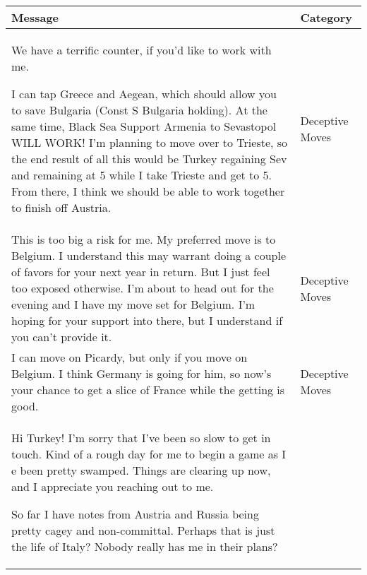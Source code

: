 \begin{table*}[t]
    \begin{tabular}{p{11cm}p{4cm}}
    \hline
    \textbf{Message} & \textbf{Category}   \\ 
    \hline
    \small{We have a terrific counter, if you’d like to work with me. 

I can tap Greece and Aegean, which should allow you to save Bulgaria (Const S Bulgaria holding). At the same time, Black Sea Support Armenia to Sevastopol WILL WORK! I’m planning to move over to Trieste, so the end result of all this would be Turkey regaining Sev and remaining at 5 while I take Trieste and get to 5. From there, I think we should be able to work together to finish off Austria.} & \small{Deceptive Moves} \\ 
    \rowcolor{grayish}  %
    \small{This is too big a risk for me. My preferred move is to Belgium. I understand this may warrant doing a couple of favors for your next year in return. But I just feel too exposed otherwise. I'm about to head out for the evening and I have my move set for Belgium. I'm hoping for your support into there, but I understand if you can't provide it.} & \small{Deceptive Moves} \\ 
    \small{I can move on Picardy, but only if you move on Belgium.  I think Germany is going for him, so now’s your chance to get a slice of France while the getting is good.} & \small{Deceptive Moves} \\ 
    \rowcolor{grayish}  %
    \small{Hi Turkey! I’m sorry that I’ve been so slow to get in touch. Kind of a rough day for me to begin a game as I e been pretty swamped. Things are clearing up now, and I appreciate you reaching out to me. 

    So far I have notes from Austria and Russia being pretty cagey and non-committal. Perhaps that is just the life of Italy? Nobody really has me in their plans?
    
}
\end{tabular}
\end{table*}
